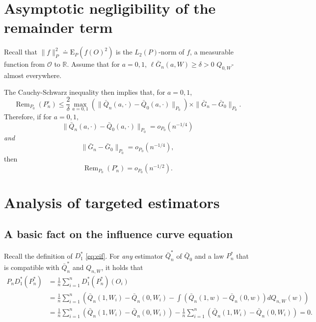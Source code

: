 \documentclass[11pt,openright,twoside]{book}
\DeclareMathOperator{\Rem}{Rem}
\newcommand{\bbR}{\mathbb{R}}
\newcommand{\defq}{\doteq}
\newcommand{\calO}{\mathcal{O}}
\newcommand{\Exp}{\textrm{E}}
\newcommand{\Gbar}{\bar{G}}
\newcommand{\Phat}{P^{\circ}}
\newcommand{\Qbar}{\bar{Q}}
\theoremstyle{definition}
\theoremstyle{definition}
\theoremstyle{definition}
\theoremstyle{remark}
\begin{document}
\hypertarget{asymp-neglig-remain}{%
\section{Asymptotic negligibility of the remainder term}\label{asymp-neglig-remain}}

Recall that \(\|f\|_{P}^{2} \defq \Exp_{P} \left( f(O)^{2} \right)\) is the
\(L_2(P)\)-norm of \(f\), a measurable function from \(\calO\) to \(\bbR\). Assume
that for \(a= 0,1\), \(\ell\Gbar_{n}(a,W) \geq \delta > 0\) \(Q_{0,W}\)-almost
everywhere.

The Cauchy-Schwarz inequality then implies that, for \(a = 0,1\),
\begin{equation*}\Rem_{P_0}(\Phat_n)   \le   \frac{2}{\delta}   \max_{a=0,1}
\left(  \|\Qbar_n   (a,\cdot)  -  \Qbar_0  (a,\cdot)\|_{P_0}   \right)  \times
\|\Gbar_n  -   \Gbar_0\|_{P_0}.\end{equation*} Therefore, if for \(a=0,1\),
\begin{equation*}\|\Qbar_n(a,\cdot)      -     \Qbar_0(a,\cdot)\|_{P_0}      =
o_{P_0}(n^{-1/4})\end{equation*} \emph{and} \begin{equation*}\|\Gbar_n     -
\Gbar_0\|_{P_0}        =         o_{P_0}(n^{-1/4}),\end{equation*} then
\begin{equation*}\Rem_{P_0}(\Phat_n) = o_{P_0}(n^{-1/2}).\end{equation*}

\hypertarget{analysis-TMLE}{%
\section{Analysis of targeted estimators}\label{analysis-TMLE}}

\hypertarget{basic-eic-eq}{%
\subsection{A basic fact on the influence curve equation}\label{basic-eic-eq}}

Recall the definition of \(D_{1}^{*}\) \eqref{eq:eif}. For \emph{any} estimator
\(\Qbar_n^*\) of \(\Qbar_0\) and a law \(P_n^{*}\) that is compatible with
\(\Qbar_n^*\) and \(Q_{n,W}\), it holds that
\begin{align*}
P_n D_1^*(P_n^*) 
&= \frac{1}{n} \sum_{i=1}^n D_1^{*}(P_n^*)(O_i)\\ 
&=\frac{1}{n}  \sum_{i=1}^n  \left(  \Qbar_n(1,W_i)   -  \Qbar_n(0,W_i)  -  \int
\left(\Qbar_n(1,w) - \Qbar_n(0,w)\right) dQ_{n,W}(w) \right) \\ 
&=   \frac{1}{n}\sum_{i=1}^n \left( \Qbar_n(1,W_i)  - \Qbar_n(0,W_i)\right) - \frac{1}{n}\sum_{i=1}^n
\left(\Qbar_n(1,W_i) - \Qbar_n(0,W_i)\right) = 0.
\end{align*}
\end{document}
